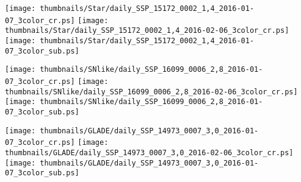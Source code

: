 \documentclass[]{pasj01}
\begin{document}
\begin{figure*}%
 \begin{center}

  \texttt{[image: thumbnails/Star/daily\_SSP\_15172\_0002\_1,4\_2016-01-07\_3color\_cr.ps]}
  \texttt{[image: thumbnails/Star/daily\_SSP\_15172\_0002\_1,4\_2016-02-06\_3color\_cr.ps]}
    \texttt{[image: thumbnails/Star/daily\_SSP\_15172\_0002\_1,4\_2016-01-07\_3color\_sub.ps]}
 \end{center}
\caption{
Candidate with the condition of $(i-z)_{\rm 1st}>0.5$ and $\Delta i>1.0$ (Procedures {\bf 4a} and {\bf b}), but rejected by Procedure {\bf 4c}.
The size of the thumbnails is 20 arcsec $\times$ 20 arcsec.
(left) Pseudo color image of the 1st epoch.
(middle) Pseudo color image of the reference epoch.
(right) Subtracted pseudo color image (left)-(middle).
The color channels of blue, green, and red, are assigned as $i$, $(i+z)/2$, and $z$, respectively.
}\label{fig:thumbnails_of_star}
\end{figure*}


\begin{figure*}%
 \begin{center}
  \texttt{[image: thumbnails/SNlike/daily\_SSP\_16099\_0006\_2,8\_2016-01-07\_3color\_cr.ps]}
  \texttt{[image: thumbnails/SNlike/daily\_SSP\_16099\_0006\_2,8\_2016-02-06\_3color\_cr.ps]}
  \texttt{[image: thumbnails/SNlike/daily\_SSP\_16099\_0006\_2,8\_2016-01-07\_3color\_sub.ps]}
 \end{center}
\caption{
Same as Figure \ref{fig:thumbnails_of_star} but for 
A Supernova like candidate. It is rejected by the decline cut (Procedure {\bf 4b}).
}\label{fig:thumbnails_of_sn}
\end{figure*}


\begin{figure*}%
 \begin{center}
  \texttt{[image: thumbnails/GLADE/daily\_SSP\_14973\_0007\_3,0\_2016-01-07\_3color\_cr.ps]}
  \texttt{[image: thumbnails/GLADE/daily\_SSP\_14973\_0007\_3,0\_2016-02-06\_3color\_cr.ps]}
  \texttt{[image: thumbnails/GLADE/daily\_SSP\_14973\_0007\_3,0\_2016-01-07\_3color\_sub.ps]}
 \end{center}
\caption{
Same as Figure \ref{fig:thumbnails_of_star} but for 
a candidate associated with a GLADE galaxy. It is rejected by the fadeout cut (Procedure {\bf 3}).
}\label{fig:thumbnails_of_GLADE}
\end{figure*}
\end{document}
